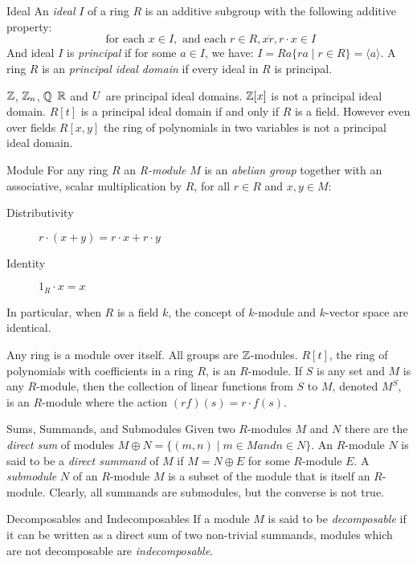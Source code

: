 \begin{definition}{Ideal}
An \emph{ideal} $I$ of a ring $R$ is an additive subgroup with the following additive property:
\[ \textrm{ for each } x \in I, \textrm{ and each } r \in R, x \dot r, r \cdot x \in I  \]
And ideal $I$ is \emph{principal} if for some $a \in I$, we have: $I = Ra \{ ra \mid r \in R\} = \langle a \rangle$.
A ring $R$ is an \emph{principal ideal domain} if every ideal in $R$ is principal.
\end{definition}
\begin{example}
$\mathbb{Z}$, $\mathbb{Z}_n$, $\mathbb{Q}$ $\mathbb{R}$ and $U$ are principal ideal domains. $\mathbb{Z}[x]$ is not a principal ideal domain. $R[t]$ is a principal ideal domain if and only if $R$ is a field. However
even over fields $R[x,y]$ the ring of polynomials in two variables is not a principal ideal domain.
\end{example}
\begin{definition}{Module}
For any ring $R$ an \emph{R-module} $M$ is an \emph{abelian group} together with an associative, scalar multiplication by $R$, for all $r \in R$ and $x,y \in M$:
\begin{description}
\item[Distributivity]  $r \cdot (x + y)  = r \cdot x + r \cdot y$
\item[Identity] $1_R \cdot x = x$
\end{description}
\end{definition}
In particular, when $R$ is a field $k$, the concept of $k$-module and $k$-vector space are identical.
\begin{example}
Any ring is a module over itself.  All groups are $\mathbb{Z}$-modules. $R[t]$, the ring of polynomials with coefficients in a ring $R$, is an $R$-module. If $S$ is any set and $M$ is any $R$-module, then the collection of linear functions from $S$ to $M$, denoted $M^S$, is an $R$-module where the action $(rf)(s) =  r \cdot f(s)$.
\end{example}
\begin{definition}{Sums, Summands, and Submodules}
Given two $R$-modules $M$ and $N$ there are the \emph{direct sum} of modules $M \oplus N = \{ (m,n) \mid m \in M and n \in N \}$.
An $R$-module $N$ is said to be a \emph{direct summand} of $M$ if $M = N \oplus E$ for some $R$-module $E$. 
A \emph{submodule} $N$ of an $R$-module $M$ is a subset of the module that is itself an $R$-module. Clearly, all summands are submodules, but the converse is not true.
\end{definition}
\begin{definition}{Decomposables and Indecomposables}
If a module $M$ is said to be \emph{decomposable} if it can be written as a direct sum of two non-trivial summands, modules which are not decomposable are \emph{indecomposable}. 
\end{definition}
